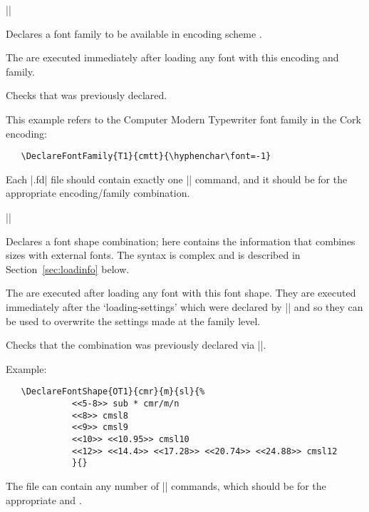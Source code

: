 \documentclass{ltxguide}[1995/11/28]
\begin{document}
\begin{decl}
  |\DeclareFontFamily|   
\end{decl}

Declares a font family  to be available in encoding scheme
.

The  are executed immediately after loading any font
with this encoding and family.

Checks that  was previously declared.

This example refers to the Computer Modern Typewriter font family in the
Cork encoding:
\begin{verbatim}
   \DeclareFontFamily{T1}{cmtt}{\hyphenchar\font=-1}
\end{verbatim}

Each |.fd| file should contain exactly one |\DeclareFontFamily| command,
and it should be for the appropriate encoding/family combination.

\begin{decl}
|\DeclareFontShape|   
                    \\
        \null\hfill {} 
\end{decl}

Declares a font shape combination; here  contains the
information that combines sizes with external fonts. The syntax is
complex and is described in Section~\ref{sec:loadinfo} below.

The  are executed after loading any font with this
font shape.  They are executed immediately after the `loading-settings'
which were declared by |\DeclareFontFamily| and so they can be used to
overwrite the settings made at the family level.

Checks that the combination  was previously
declared via |\DeclareFontFamily|.

Example:
\begin{verbatim}
   \DeclareFontShape{OT1}{cmr}{m}{sl}{%
             <<5-8>> sub * cmr/m/n
             <<8>> cmsl8
             <<9>> cmsl9
             <<10>> <<10.95>> cmsl10
             <<12>> <<14.4>> <<17.28>> <<20.74>> <<24.88>> cmsl12
             }{}
\end{verbatim}
The file can contain any number of |\DeclareFontShape| commands, which
should be for the appropriate  and .
\end{document}
